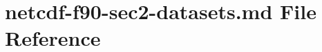 \hypertarget{netcdf-f90-sec2-datasets_8md}{}\section{netcdf-\/f90-\/sec2-\/datasets.md File Reference}
\label{netcdf-f90-sec2-datasets_8md}
